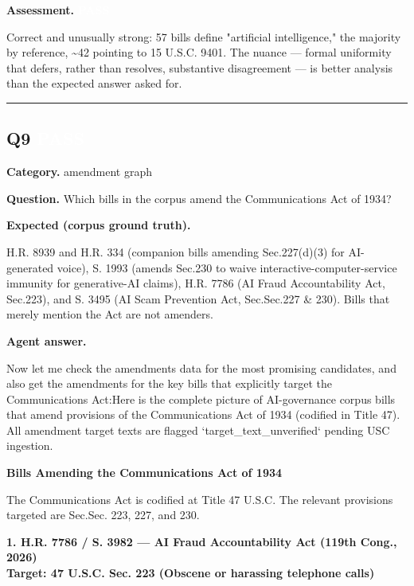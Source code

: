 \documentclass[11pt]{article}
\newcommand{\fieldlabel}[1]{\textbf{\color{navy}#1}\quad}
\begin{document}
\fieldlabel{Assessment.} \colorbox{passgreen}{\textcolor{white}{\bfseries PASS}}\par
Correct and unusually strong: 57 bills define "artificial intelligence," the majority by reference, \textasciitilde{}42 pointing to 15 U.S.C. 9401. The nuance --- formal uniformity that defers, rather than resolves, substantive disagreement --- is better analysis than the expected answer asked for.
\vspace{4pt}\hrule\vspace{8pt}
\subsection*{Q9 \quad \colorbox{passgreen}{\textcolor{white}{\bfseries PASS}}}
\fieldlabel{Category.} amendment graph\par
\fieldlabel{Question.} Which bills in the corpus amend the Communications Act of 1934?\par
\fieldlabel{Expected (corpus ground truth).}\par
H.R. 8939 and H.R. 334 (companion bills amending Sec.227(d)(3) for AI-generated voice), S. 1993 (amends Sec.230 to waive interactive-computer-service immunity for generative-AI claims), H.R. 7786 (AI Fraud Accountability Act, Sec.223), and S. 3495 (AI Scam Prevention Act, Sec.Sec.227 \& 230). Bills that merely mention the Act are not amenders.

\fieldlabel{Agent answer.}\par
Now let me check the amendments data for the most promising candidates, and also get the amendments for the key bills that explicitly target the Communications Act:Here is the complete picture of AI-governance corpus bills that amend provisions of the Communications Act of 1934 (codified in Title 47). All amendment target texts are flagged `target\_text\_unverified` pending USC ingestion.

\textbf{Bills Amending the Communications Act of 1934}

The Communications Act is codified at Title 47 U.S.C. The relevant provisions targeted are Sec.Sec. 223, 227, and 230.

\textbf{1. \textbf{H.R. 7786 / S. 3982 --- AI Fraud Accountability Act} (119th Cong., 2026)} \\
\textbf{Target: 47 U.S.C. Sec. 223 (Obscene or harassing telephone calls)}
\end{document}
